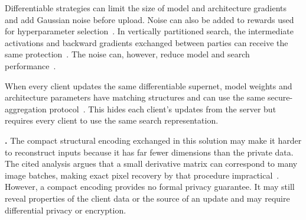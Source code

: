  Differentiable strategies can limit the size of model and architecture gradients and add Gaussian noise before upload. Noise can also be added to rewards used for hyperparameter selection~\cite{dp-fnas_2020,feathers_2023}. In vertically partitioned search, the intermediate activations and backward gradients exchanged between parties can receive the same protection~\cite{self-supervised_vertical_fednas_2023}. The noise can, however, reduce model and search performance~\cite{privacy_preserving_fednas_for_edge_2025}.

 When every client updates the same differentiable supernet, model weights and architecture parameters have matching structures and can use the same secure-aggregation protocol~\cite{privacy_preserving_fednas_for_edge_2025}. This hides each client's updates from the server but requires every client to use the same search representation.

\noindent\textbf{.} The compact structural encoding exchanged in this solution may make it harder to reconstruct inputs because it has far fewer dimensions than the private data. The cited analysis argues that a small derivative matrix can correspond to many image batches, making exact pixel recovery by that procedure impractical~\cite{multi-granular_fednas_2023}. However, a compact encoding provides no formal privacy guarantee. It may still reveal properties of the client data or the source of an update and may require differential privacy or encryption.
